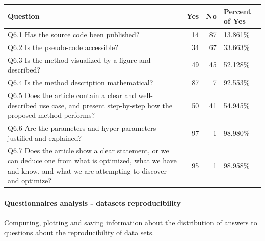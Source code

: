 \documentclass[
]{article}
\begin{document}
\begin{tabular}{l|r|r|l}
\hline
Question & Yes & No & Percent of Yes\\
\hline
Q6.1 Has the source code been published? & 14 & 87 & 13.861\%\\
\hline
Q6.2 Is the pseudo-code accessible? & 34 & 67 & 33.663\%\\
\hline
Q6.3 Is the method visualized by a figure and described? & 49 & 45 & 52.128\%\\
\hline
Q6.4 Is the method description mathematical? & 87 & 7 & 92.553\%\\
\hline
Q6.5 Does the article contain a clear and well-described use case, and present step-by-step how the proposed method performs? & 50 & 41 & 54.945\%\\
\hline
Q6.6 Are the parameters and hyper-parameters justified and explained? & 97 & 1 & 98.980\%\\
\hline
Q6.7 Does the article show a clear statement, or we can deduce one from what is optimized, what we have and know, and what we are attempting to discover and optimize? & 95 & 1 & 98.958\%\\
\hline
\end{tabular}

\hypertarget{questionnaires-analysis---datasets-reproducibility}{%
\paragraph{Questionnaires analysis - datasets reproducibility}\label{questionnaires-analysis---datasets-reproducibility}}

Computing, plotting and saving information about the distribution of answers to questions about the reproducibility of data sets.
\end{document}
